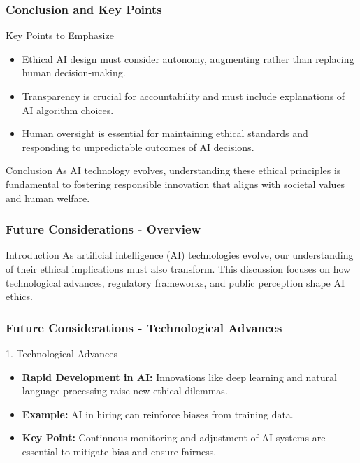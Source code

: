 \documentclass[aspectratio=169]{beamer}
\begin{document}
\begin{frame}[fragile]
    \frametitle{Conclusion and Key Points}
    \begin{block}{Key Points to Emphasize}
        \begin{itemize}
            \item Ethical AI design must consider autonomy, augmenting rather than replacing human decision-making.
            \item Transparency is crucial for accountability and must include explanations of AI algorithm choices.
            \item Human oversight is essential for maintaining ethical standards and responding to unpredictable outcomes of AI decisions.
        \end{itemize}
    \end{block}

    \begin{block}{Conclusion}
        As AI technology evolves, understanding these ethical principles is fundamental to fostering responsible innovation that aligns with societal values and human welfare.
    \end{block}
\end{frame}

\begin{frame}[fragile]
    \frametitle{Future Considerations - Overview}
    \begin{block}{Introduction}
        As artificial intelligence (AI) technologies evolve, our understanding of their ethical implications must also transform. This discussion focuses on how technological advances, regulatory frameworks, and public perception shape AI ethics.
    \end{block}
\end{frame}

\begin{frame}[fragile]
    \frametitle{Future Considerations - Technological Advances}
    \begin{block}{1. Technological Advances}
        \begin{itemize}
            \item \textbf{Rapid Development in AI:} Innovations like deep learning and natural language processing raise new ethical dilemmas.
            \item \textbf{Example:} AI in hiring can reinforce biases from training data.
            \item \textbf{Key Point:} Continuous monitoring and adjustment of AI systems are essential to mitigate bias and ensure fairness.
        \end{itemize}
    \end{block}
\end{frame}
\end{document}
